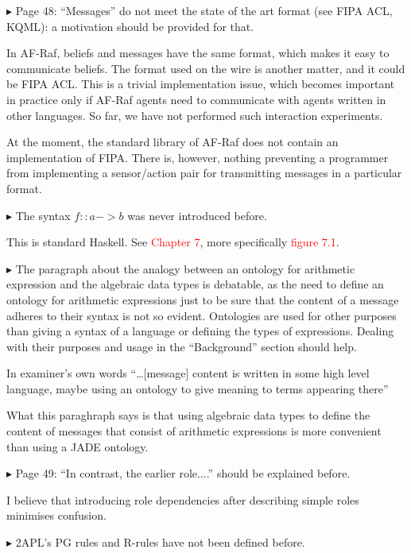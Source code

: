\documentclass{article}
\newcommand*\R[1]{\textcolor{red}{#1}} %
\newcommand{\todo}[1]{[\textcolor{green}{TODO}: #1]}
\newenvironment{them}%
  {\bigskip\noindent\begingroup\color{blue}$\blacktriangleright$\enspace}%
  {\endgroup\par}
\begin{document}
\begin{them}
Page 48:
``Messages'' do not meet the state of the art format (see FIPA ACL, KQML): a
motivation should be provided for that.
\end{them}

In AF-Raf,
  beliefs and messages have the same format,
  which makes it easy to communicate beliefs.
The format used on the wire is another matter,
  and it could be FIPA ACL\null.
This is a trivial implementation issue,
  which becomes important in practice only if AF-Raf agents
  need to communicate with agents written in other languages.
So far, we have not performed such interaction experiments.

At the moment,
  the standard library of AF-Raf does not contain an implementation of FIPA\null.
There is, however,
  nothing preventing a programmer from implementing a sensor/action pair
  for transmitting messages in a particular format.


\begin{them}
The syntax $f::a->b$ was never introduced before.
\end{them}
This is standard Haskell. See \R{Chapter 7}, more specifically \R{figure 7.1}.

\begin{them}
The paragraph about the analogy between an ontology for arithmetic expression
and the algebraic data types is debatable, as the need to define an ontology
for arithmetic expressions just to be sure that the content of a message
adheres to their syntax is not so evident. Ontologies are used for other
purposes than giving a syntax of a language or defining the types of
expressions. Dealing with their purposes and usage in the ``Background'' section
should help.
\end{them}
In examiner's own words ``\ldots [message] content is written in some high
level language, maybe using an ontology to give meaning to terms appearing
there''

What this paraghraph says is that using algebraic data types to define the
content of messages that consist of arithmetic expressions is more convenient
than using a JADE ontology.

\begin{them}
Page 49:
``In contrast, the earlier role....'' should be explained before.
\end{them}
I believe that introducing role dependencies after describing simple roles
minimises confusion.

\begin{them}
2APL's PG rules and R-rules have not been defined before.
\end{them}
\todo{define 2APL`s rules}
\end{document}
